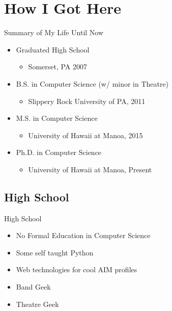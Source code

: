\documentclass{beamer}
\begin{document}
\section{How I Got Here}
\begin{frame}{Summary of My Life Until Now}
\begin{itemize}
	\item Graduated High School
	\begin{itemize}
		\item Somerset, PA 2007
	\end{itemize}
	\item B.S. in Computer Science (w/ minor in Theatre)
	\begin{itemize}
		\item Slippery Rock University of PA, 2011
	\end{itemize}
	\item M.S. in Computer Science
	\begin{itemize}
		\item University of Hawaii at Manoa, 2015
	\end{itemize}
	\item Ph.D. in Computer Science
	\begin{itemize}
		\item University of Hawaii at Manoa, Present
	\end{itemize}
\end{itemize}
\end{frame}

\subsection{High School}
\begin{frame}{High School}
\begin{itemize}
	\item No Formal Education in Computer Science
	\item Some self taught Python
	\item Web technologies for cool AIM profiles
	\item Band Geek
	\item Theatre Geek
\end{itemize}
\end{frame}
\end{document}
